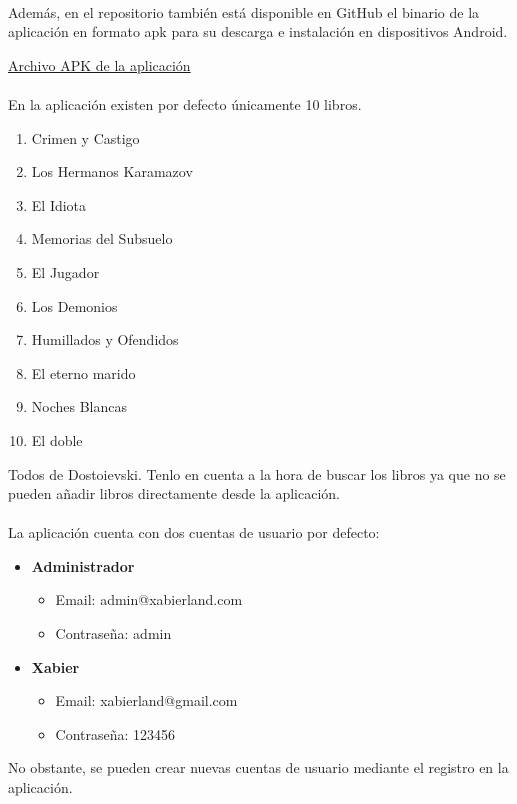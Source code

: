 \documentclass[a4paper,11pt]{report}
\begin{document}
    \paragraph*{}{
      Además, en el repositorio también está disponible en GitHub el binario de la aplicación en formato apk para su descarga e instalación en dispositivos Android.
    }
    \begin{center}
        \color{blue}\href{https://github.com/Xabierland/DAS-Proyecto/releases}{Archivo APK de la aplicación}
    \end{center}
    \paragraph*{}{
      En la aplicación existen por defecto únicamente 10 libros.
      \begin{multicols}{2}
        \begin{enumerate}
          \item Crimen y Castigo
          \item Los Hermanos Karamazov
          \item El Idiota
          \item Memorias del Subsuelo
          \item El Jugador
          \item Los Demonios
          \item Humillados y Ofendidos
          \item El eterno marido
          \item Noches Blancas
          \item El doble
        \end{enumerate}
      \end{multicols}
      Todos de Dostoievski. Tenlo en cuenta a la hora de buscar los libros ya que no se pueden añadir libros directamente desde la aplicación.
    }
    \paragraph*{}{
      La aplicación cuenta con dos cuentas de usuario por defecto:
      \begin{itemize}
        \item \textbf{Administrador}
          \begin{itemize}
            \item Email: admin@xabierland.com
            \item Contraseña: admin
          \end{itemize}
        \item \textbf{Xabier}
          \begin{itemize}
            \item Email: xabierland@gmail.com
            \item Contraseña: 123456
          \end{itemize}
      \end{itemize}
      No obstante, se pueden crear nuevas cuentas de usuario mediante el registro en la aplicación.
    }  
\end{document}
